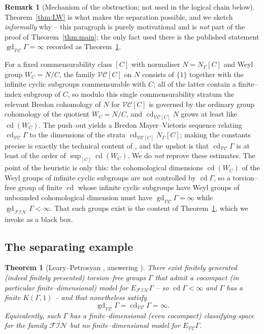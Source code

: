 \documentclass{amsart}
\newtheorem{theorem}{Theorem}
\theoremstyle{definition}
\newtheorem{remark}{Remark}
\newcommand{\FIN}{\mathcal{F\!I\!N}}
\newcommand{\VC}{\mathcal{V\!C}}
\newcommand{\gd}{\operatorname{gd}}
\newcommand{\cd}{\operatorname{cd}}
\begin{document}
\begin{remark}[Mechanism of the obstruction; not used in the logical chain below]\label{rem:mechanism}
Theorem~\ref{thm:LW} is what makes the separation possible, and we sketch \emph{informally}
why -- this paragraph is purely motivational and is \emph{not} part of the proof of
Theorem~\ref{thm:main}; the only fact used there is the published statement
$\gd_{\VC}\Gamma=\infty$ recorded as Theorem~\ref{thm:LP}.

For a fixed commensurability class $[C]$ with normaliser $N=N_\Gamma[C]$ and Weyl group
$W_C=N/C$, the family $\VC[C]$ on $N$ consists of $\{1\}$ together with the infinite cyclic
subgroups commensurable with $C$; all of the latter contain a finite--index subgroup of $C$,
so modulo this single commensurability stratum the relevant Bredon cohomology of $N$ for
$\VC[C]$ is governed by the ordinary group cohomology of the quotient $W_C=N/C$, and
$\cd_{\VC[C]}N$ grows at least like $\cd(W_C)$. The push--out yields a Bredon Mayer--Vietoris
sequence relating $\cd_{\VC}\Gamma$ to the dimensions of the strata $\cd_{\VC[C]}N_\Gamma[C]$;
making the constants precise is exactly the technical content of
\cite{LueckWeiermann,LearyPetrosyan}, and the upshot is that $\cd_{\VC}\Gamma$ is at least of
the order of $\sup_{[C]}\cd(W_C)$. We do \emph{not} reprove these estimates. The point of the
heuristic is only this: the cohomological dimensions $\cd(W_C)$ of the Weyl groups of infinite
cyclic subgroups are not controlled by $\cd\Gamma$, so a torsion--free group of finite $\cd$
whose infinite cyclic subgroups have Weyl groups of unbounded cohomological dimension must
have $\gd_{\VC}\Gamma=\infty$ while $\gd_{\FIN}\Gamma<\infty$. That such groups exist is the
content of Theorem~\ref{thm:LP}, which we invoke as a black box.
\end{remark}

\subsection{The separating example}

\begin{theorem}[Leary--Petrosyan {\cite[Theorem~B and \S\S 1--2]{LearyPetrosyan}}, answering
{\cite{JPL}}]\label{thm:LP}
There exist finitely generated (indeed finitely presented) torsion--free groups $\Gamma$ that
admit a \emph{cocompact} (in particular finite--dimensional) model for $E_{\FIN}\Gamma$ -- so
$\cd\Gamma<\infty$ and $\Gamma$ has a finite $K(\Gamma,1)$ -- and that nonetheless satisfy
\[
\gd_{\VC}\Gamma=\cd_{\VC}\Gamma=\infty .
\]
Equivalently, such $\Gamma$ has a finite--dimensional (even cocompact) classifying space for
the family $\FIN$ but no finite--dimensional model for $E_{\VC}\Gamma$.
\end{theorem}
\end{document}
